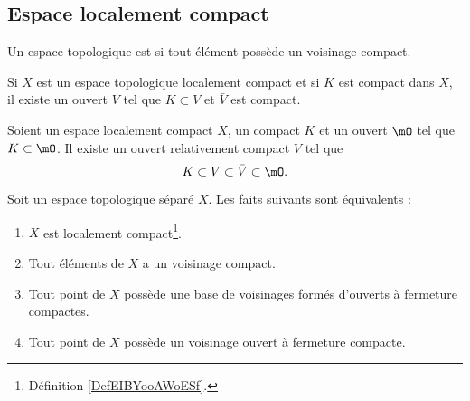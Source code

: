 \subsection{Espace localement compact}

\begin{definition}  \label{DefEIBYooAWoESf}
	Un espace topologique est  si tout élément possède un voisinage compact.
\end{definition}

\begin{lemma}       \label{LEMooAXESooYvyesg}
	Si \( X\) est un espace topologique localement compact et si \( K\) est compact dans \( X\), il existe un ouvert \( V\) tel que \( K\subset V\) et \( \bar V\) est compact.
\end{lemma}

\begin{lemma}       \label{LEMooKYMKooPxZjWN}
	Soient un espace localement compact \( X\), un compact \( K\) et un ouvert \( \mO\) tel que \( K\subset \mO\). Il existe un ouvert relativement compact \( V\) tel que
	\begin{equation}
		K\subset V\subset \bar V\subset \mO.
	\end{equation}
\end{lemma}


\begin{proposition}	\label{PROPooVLOZooLlYNNa}
	Soit un espace topologique séparé \( X\). Les faits suivants sont équivalents :
	\begin{enumerate}
		\item		\label{ITEMooZLNUooHcTakl}
		      \( X\) est localement compact\footnote{Définition \ref{DefEIBYooAWoESf}.}.
		\item		\label{ITEMooYMKMooUkcNzd}
		      Tout éléments de \( X\) a un voisinage compact.
		\item		\label{ITEMooXYYHooTCZMJr}
		      Tout point de \( X\) possède une base de voisinages formés d'ouverts à fermeture compactes.
		\item		\label{ITEMooBTECooDDsTuo}
		      Tout point de \( X\) possède un voisinage ouvert à fermeture compacte.
	\end{enumerate}
\end{proposition}

